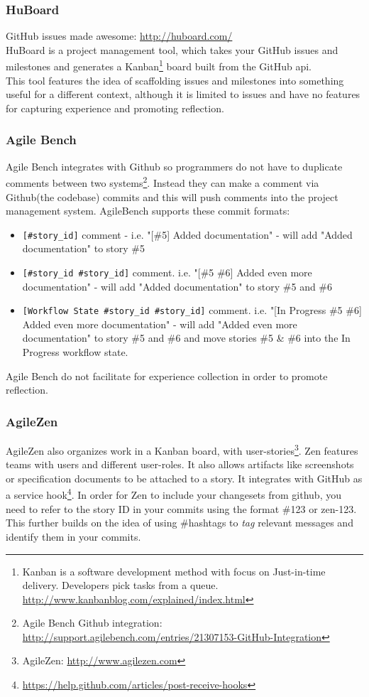 \subsubsection{HuBoard}
GitHub issues made awesome: \url{http://huboard.com/} \\
HuBoard is a project management tool, which takes your GitHub issues and milestones and generates a Kanban\footnote{Kanban is a software development method with focus on Just-in-time delivery. Developers pick tasks from a queue. \url{http://www.kanbanblog.com/explained/index.html}} board built from the GitHub api. \\
This tool features the idea of scaffolding issues and milestones into something useful for a different context, although it is limited to issues and have no features for capturing experience and promoting reflection. 
\subsubsection*{Agile Bench}
Agile Bench integrates with Github so programmers do not have to duplicate comments between two systems\footnote{Agile Bench Github integration: \url{http://support.agilebench.com/entries/21307153-GitHub-Integration}}. Instead they can make a comment via Github(the codebase) commits and this will push comments into the project management system. AgileBench supports these commit formats:
\begin{itemize}
\item \verb|[#story_id]| comment - i.e. "[\#5] Added documentation" - will add "Added documentation" to story \#5
\item \verb|[#story_id #story_id]| comment. i.e. "[\#5 \#6] Added even more documentation" - will add "Added documentation" to story \#5 and \#6
\item \verb|[Workflow State #story_id #story_id]| comment. i.e. "[In Progress \#5 \#6] Added even more documentation" - will add "Added even more documentation" to story \#5 and \#6 and move stories \#5 \& \#6 into the In Progress workflow state.
\end{itemize}
Agile Bench do not facilitate for experience collection in order to promote reflection.
\subsubsection*{AgileZen}
AgileZen also organizes work in a Kanban board, with user-stories\footnote{AgileZen: \url{http://www.agilezen.com}}. Zen features teams with users and different user-roles. It also allows artifacts like screenshots or specification documents to be attached to a story. It integrates with GitHub as a service hook\footnote{\url{https://help.github.com/articles/post-receive-hooks}}. In order for Zen to include your changesets from github, you need to refer to the story ID in your commits using the format \#123 or zen-123. This further builds on the idea of using \#hashtags to \textit{tag} relevant messages and identify them in your commits. 